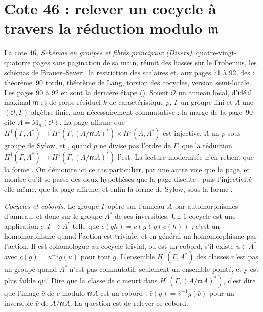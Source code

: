 \section[Cote 46 : relever un cocycle à travers la réduction modulo $\mathfrak m$]{Cote 46 : relever un cocycle à travers la réduction modulo $\mathfrak m$\protect{}}\label{sec:46}

La cote 46, \emph{Schémas en groupes et fibrés principaux (Divers)}, quatre-vingt-quatorze pages sans pagination de sa main, réunit des liasses sur le Frobenius, les schémas de Brauer--Severi, la restriction des scalaires et, aux pages 71 à 92, des  : théorème~90 tordu, théorème de Lang, torsion des cocycles, version semi-locale. Les pages 90 à 92 en sont la dernière étape (). Soient $\mathcal O$ un anneau local, d'idéal maximal $\mathfrak m$ et de corps résiduel $k$ de caractéristique $p$, $\Gamma$ un groupe fini et $A$ une $(\mathcal O, \Gamma)$-algèbre finie, non nécessairement commutative : la marge de la page~90 cite $A = \mathrm M_n(\mathcal O)$. La page affirme que $H^1(\Gamma, A^*) \to H^1(\Gamma, (A/\mathfrak mA)^*) \times H^1(\Lambda, A^*)$ est injective, $\Lambda$ un $p$-sous-groupe de Sylow, et , quand $p$ ne divise pas l'ordre de $\Gamma$, que la réduction $H^1(\Gamma, A^*) \to H^1(\Gamma, (A/\mathfrak mA)^*)$ l'est. La lecture modernisée n'en retient que la forme . On démontre ici ce cas particulier, par une autre voie que la page, et montre qu'il se passe des deux hypothèses que la page discute ; puis l'injectivité elle-même, que la page affirme, et enfin la forme de Sylow, sous la forme .

\noindent\emph{Cocycles et cobords.} Le groupe $\Gamma$ opère sur l'anneau $A$ par automorphismes d'anneau, et donc sur le groupe $A^*$ de ses inversibles. Un $1$-cocycle est une application $c : \Gamma \to A^*$ telle que $c(gh) = c(g)\, g(c(h))$ ; c'est un homomorphisme quand l'action est triviale, et en général un homomorphisme  par l'action. Il est cohomologue au cocycle trivial, ou est un cobord, s'il existe $u \in A^*$ avec $c(g) = u^{-1} g(u)$ pour tout $g$. L'ensemble $H^1(\Gamma, A^*)$ des classes n'est pas un groupe quand $A^*$ n'est pas commutatif, seulement un ensemble pointé, et  y est plus faible qu'. Dire que la classe de $c$ meurt dans $H^1(\Gamma, (A/\mathfrak mA)^*)$, c'est dire que l'image $\bar c$ de $c$ modulo $\mathfrak mA$ est un cobord : $\bar c(g) = \bar v^{-1} g(\bar v)$ pour un inversible $\bar v$ de $A/\mathfrak mA$. La question est de relever ce cobord.

